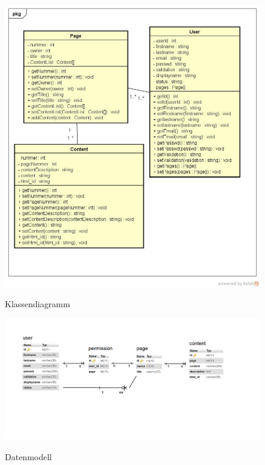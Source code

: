 \documentclass[10pt]{scrarticle}
\begin{document}

\begin{figure}[h]
\caption{Klassendiagramm}
\includegraphics[width=\textwidth]{ClassDiagram}
\label{fig:classdiagram}
\end{figure}

\begin{figure}[h]
\caption{Datenmodell}
\includegraphics[width=\textwidth]{DatenmodellEPortfolio}
\label{fig:datenmodell}
\end{figure}
\end{document}
